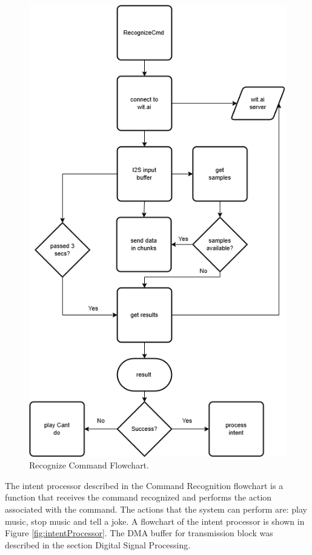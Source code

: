 \begin{figure}[H]
    \centering
    \includegraphics*[scale = 0.6]{Images/recognizeCmd.png}
    \caption{Recognize Command Flowchart.}
    \label{fig:recognizeCmd}
\end{figure}

The intent processor described in the Command Recognition flowchart is a function that receives the command recognized and performs the action associated with the command. The actions that the system can perform are: play music, stop music and tell a joke. A flowchart of the intent processor is shown in Figure \ref{fig:intentProcessor}. The DMA buffer for transmission block was described in the section Digital Signal Processing.

